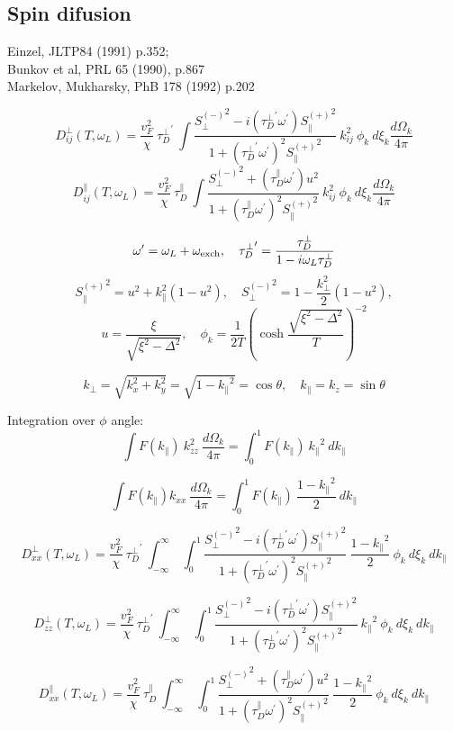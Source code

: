\documentclass[a4paper]{article}
\begin{document}
\subsection*{Spin difusion}

\def\tdp{\tau_D^\perp}
\def\tdpa{\tau_D^\parallel}
\def\ol{\omega_L}
\def\oe{\omega_{\rm exch}}
\def\op{\omega^\prime}
\def\tp{{\tdp}^\prime}
\def\t{\tdpa}

\def\sm{{S_\perp^{(-)}}^2}
\def\sp{{S_\parallel^{(+)}}^2}

\def\kpe{{k_\perp}}
\def\kpa{{k_\parallel}}

\def\smx{{S_{xx}^{(-)}}^2}
\def\spz{{S_{zz}^{(+)}}^2}


Einzel, JLTP84 (1991) p.352;\\
Bunkov et al, PRL 65 (1990), p.867\\
Markelov, Mukharsky, PhB 178 (1992) p.202

$$
D^\perp_{ij}(T, \ol) =
  \frac{v_F^2}{\chi}\ \tp
  \  \int \frac{\sm - i(\tp\op)\sp}{1+(\tp\op)^2\sp}
  \  k_{ij}^2\ \phi_k\ d\xi_k\frac{d\Omega_k}{4\pi}
$$
$$
D^\parallel_{ij}(T, \ol) =
  \frac{v_F^2}{\chi}\ \t
  \  \int \frac{\sm + (\t\op)u^2 }{1+(\t\op)^2\sp}
  \  k_{ij}^2\ \phi_k\ d\xi_k\frac{d\Omega_k}{4\pi}
$$

$$
\op = \ol+\oe,\quad
\tp = \frac{\tdp}{1-i\ol\tdp}
$$
$$
\sp = u^2 + k_\parallel^2(1-u^2),\quad
\sm = 1-\frac{k_\perp^2}{2}(1-u^2),
$$
$$
u=\frac{\xi}{\sqrt{\xi^2-\Delta^2}}, \quad
\phi_k = \frac{1}{2T}\left(\cosh\frac{\sqrt{\xi^2-\Delta^2}}{T}\right)^{-2}
$$

$$
k_\perp = \sqrt{k_x^2+k_y^2} = \sqrt{1-\kpa^2} = \cos\theta, \quad
k_\parallel = k_z = \sin\theta
$$

Integration over $\phi$ angle:
$$
\int F(\kpa)\ k_{zz}^2\ \frac{d\Omega_k}{4\pi} =
\int_0^1 F(\kpa)\ \kpa^2\ d\kpa
$$

$$
\int F(\kpa) k_{xx}\ \frac{d\Omega_k}{4\pi} =
\int_0^1 F(\kpa)\ \frac{1-\kpa^2}{2}\ d\kpa
$$


$$
D^\perp_{xx}(T, \ol) =
  \frac{v_F^2}{\chi}\ \tp
  \ \int_{-\infty}^{\infty}\ \int_{0}^{1}
  \frac{\sm - i(\tp\op)\sp}{1+(\tp\op)^2\sp}
  \ \frac{1-\kpa^2}{2}\ \phi_k\ d\xi_k\ d\kpa
$$

$$
D^\perp_{zz}(T, \ol) =
  \frac{v_F^2}{\chi}\ \tp
  \ \int_{-\infty}^{\infty}\ \int_{0}^{1}
  \frac{\sm - i(\tp\op)\sp}{1+(\tp\op)^2\sp}
  \ \kpa^2\ \phi_k\ d\xi_k\ d\kpa
$$

$$
D^\parallel_{xx}(T, \ol) =
  \frac{v_F^2}{\chi}\ \t
  \ \int_{-\infty}^{\infty}\ \int_{0}^{1}
  \frac{\sm + (\t\op)u^2 }{1+(\t\op)^2\sp}
  \  \frac{1-\kpa^2}{2}\ \phi_k\ d\xi_k\ d\kpa
$$
\end{document}
